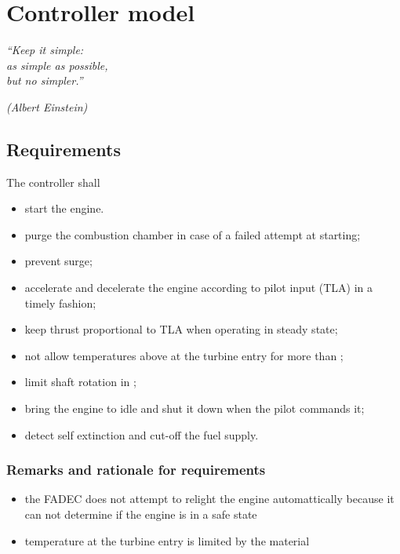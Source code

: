 \documentclass[tcc]{subfiles}
\begin{document}
\chapter{Controller model}
\label{ch:control}
\epigraph{\em ``Keep it simple:\\
as simple as possible,\\
but no simpler.''}{\em (Albert Einstein)}

\section{Requirements}
The controller shall
\begin{itemize}
    \item start the engine.
    \item purge the combustion chamber in case of a failed attempt at starting;
    \item prevent surge;
    \item accelerate and decelerate the engine according to pilot input (\acs{TLA}) in a timely fashion;
    \item keep thrust proportional to \gls{TLA} when operating in steady state;
    \item not allow temperatures above  at the turbine entry for more than ;
    \item limit shaft rotation in ;
    \item bring the engine to idle and shut it down when the pilot commands it;
    \item detect self extinction and cut-off the fuel supply.
\end{itemize}

\subsection{Remarks and rationale for requirements}
\begin{itemize}
    \item the \gls{FADEC} does not attempt to relight the engine automattically 
          because it can not determine if the engine is in a safe state
    \item temperature at the turbine entry is limited by the material 
\end{itemize}
\end{document}

